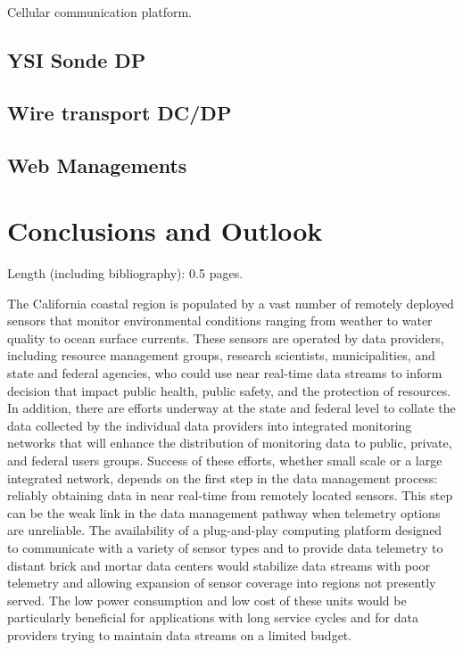 \documentclass[conference]{IEEEtran}
\begin{document}
Cellular communication platform.



\subsection{YSI Sonde DP}

\subsection{Wire transport DC/DP}

\subsection{Web Managements}


\section{Conclusions and Outlook}

Length (including bibliography): 0.5 pages.

The California coastal region is populated by a vast number of
remotely deployed sensors that monitor environmental conditions
ranging from weather to water quality to ocean surface currents.
These sensors are operated by data providers, including resource
management groups, research scientists, municipalities, and state and
federal agencies, who could use near real-time data streams to inform
decision that impact public health, public safety, and the protection
of resources.  In addition, there are efforts underway at the state
and federal level to collate the data collected by the individual data
providers into integrated monitoring networks that will enhance the
distribution of monitoring data to public, private, and federal users
groups.  Success of these efforts, whether small scale or a large
integrated network, depends on the first step in the data management
process: reliably obtaining data in near real-time from remotely
located sensors.  This step can be the weak link in the data
management pathway when telemetry options are unreliable.  The
availability of a plug-and-play computing platform designed to
communicate with a variety of sensor types and to provide data
telemetry to distant brick and mortar data centers would stabilize
data streams with poor telemetry and allowing expansion of sensor
coverage into regions not presently served.  The low power consumption
and low cost of these units would be particularly beneficial for
applications with long service cycles and for data providers trying to
maintain data streams on a limited budget.

%
%
\end{document}
